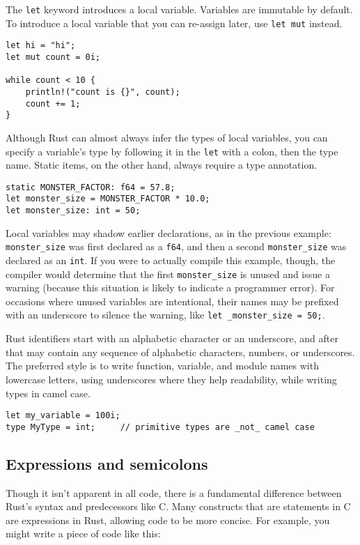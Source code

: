 \documentclass[]{article}
\begin{document}
The \texttt{let} keyword introduces a local variable. Variables are
immutable by default. To introduce a local variable that you can
re-assign later, use \texttt{let mut} instead.

\begin{verbatim}
let hi = "hi";
let mut count = 0i;

while count < 10 {
    println!("count is {}", count);
    count += 1;
}
\end{verbatim}

Although Rust can almost always infer the types of local variables, you
can specify a variable's type by following it in the \texttt{let} with a
colon, then the type name. Static items, on the other hand, always
require a type annotation.

\begin{verbatim}
static MONSTER_FACTOR: f64 = 57.8;
let monster_size = MONSTER_FACTOR * 10.0;
let monster_size: int = 50;
\end{verbatim}

Local variables may shadow earlier declarations, as in the previous
example: \texttt{monster\_size} was first declared as a \texttt{f64},
and then a second \texttt{monster\_size} was declared as an
\texttt{int}. If you were to actually compile this example, though, the
compiler would determine that the first \texttt{monster\_size} is unused
and issue a warning (because this situation is likely to indicate a
programmer error). For occasions where unused variables are intentional,
their names may be prefixed with an underscore to silence the warning,
like \texttt{let \_monster\_size = 50;}.

Rust identifiers start with an alphabetic character or an underscore,
and after that may contain any sequence of alphabetic characters,
numbers, or underscores. The preferred style is to write function,
variable, and module names with lowercase letters, using underscores
where they help readability, while writing types in camel case.

\begin{verbatim}
let my_variable = 100i;
type MyType = int;     // primitive types are _not_ camel case
\end{verbatim}

\subsection{Expressions and
semicolons}\label{expressions-and-semicolons}

Though it isn't apparent in all code, there is a fundamental difference
between Rust's syntax and predecessors like C. Many constructs that are
statements in C are expressions in Rust, allowing code to be more
concise. For example, you might write a piece of code like this:
\end{document}
